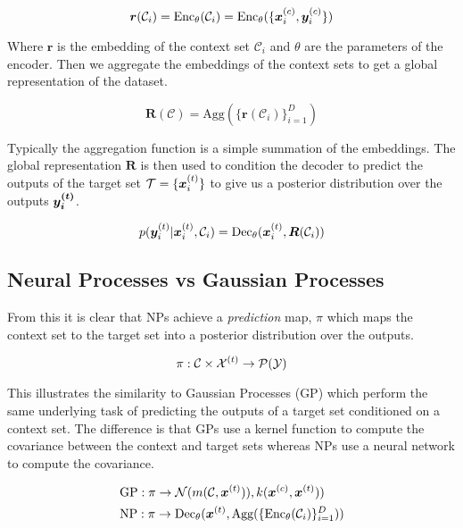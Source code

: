 \documentclass[main.tex]{subfiles}
\begin{document}
\begin{equation}
    \bm{r}(\mathcal{C}_i) = \text{Enc}_\theta(\mathcal{C}_i) = \text{Enc}_\theta(\{ \bm{x}_{i}^{(c)}, \bm{y}_i^{(c)} \})
\end{equation}

Where $\bm{r}$ is the embedding of the context set $\mathcal{C}_i$ and $\theta$ are the parameters of the encoder. Then we aggregate the embeddings of the context sets to get a global representation of the dataset. 

\begin{equation}
    \bm{R}(\mathcal{C}) = \text{Agg}(\{ \bm{r}(\mathcal{C}_i) \}_{i=1}^D)
\end{equation}

Typically the aggregation function is a simple summation of the embeddings. The global representation $\bm{R}$ is then used to condition the decoder to predict the outputs of the target set $\mathcal{T} = \{ \bm{x}_{i}^{(t)} \}$ to give us a posterior distribution over the outputs $\bm{y_i^{(t)}}$.

\begin{equation}
    p(\bm{y}_i^{(t)} | \bm{x}_i^{(t)}, \mathcal{C}_i) = \text{Dec}_\theta(\bm{x}_i^{(t)}, \bm{R}(\mathcal{C}_i))
\end{equation}

\subsection{Neural Processes vs Gaussian Processes}

From this it is clear that NPs achieve a \emph{prediction} map, $\pi$ which maps the context set to the target set into a posterior distribution over the outputs. 

\begin{equation}
    \pi: \mathcal{C} \times \mathcal{X}^{(t)} \rightarrow \mathcal{P}(\mathcal{Y})
\end{equation}


This illustrates the similarity to Gaussian Processes (GP) \cite{books/lib/RasmussenW06} which perform the same underlying task of predicting the outputs of a target set conditioned on a context set. The difference is that GPs use a kernel function to compute the covariance between the context and target sets whereas NPs use a neural network to compute the covariance.

\begin{align}
    &\text{GP}: \pi \rightarrow \mathcal{N}(m(
    \mathcal{C}, \bm{x}^{(t)})
    ), k(\bm{x}^{(c)}, \bm{x}^{(t)})) \\
    &\text{NP}: \pi \rightarrow \text{Dec}_\theta(\bm{x}^{(t)},  
    \text{Agg}(\{ \text{Enc}_\theta(\mathcal{C}_i) \}_{i=1}^D))
\end{align}
\end{document}

